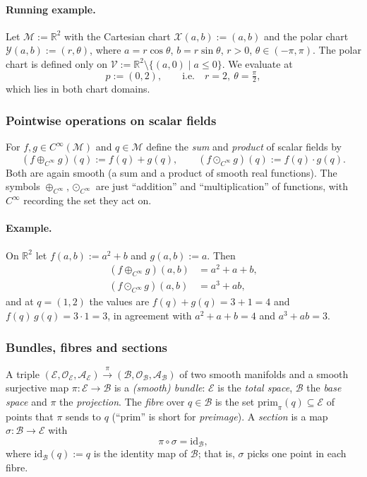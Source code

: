 \documentclass[11pt]{article}
\newcommand{\Cinf}{C^\infty(\mathcal M)}
\begin{document}
\paragraph{Running example.} Let $\mathcal M:=\mathbb R^2$ with the Cartesian chart $\mathcal X(a,b):=(a,b)$ and the polar chart $\mathcal Y(a,b):=(r,\theta)$, where $a=r\cos\theta$, $b=r\sin\theta$, $r>0$, $\theta\in(-\pi,\pi)$. The polar chart is defined only on $\mathcal V:=\mathbb R^2\setminus\{(a,0)\mid a\le0\}$. We evaluate at
\[
p:=(0,2),\qquad\text{i.e.}\quad r=2,\ \theta=\tfrac\pi2,
\]
which lies in both chart domains.

\subsubsection*{Pointwise operations on scalar fields}
For $f,g\in\Cinf$ and $q\in\mathcal M$ define the \emph{sum} and \emph{product} of scalar fields by
\[
(f\oplus_{C^\infty}g)(q):=f(q)+g(q),\qquad (f\odot_{C^\infty}g)(q):=f(q)\cdot g(q).
\]
Both are again smooth (a sum and a product of smooth real functions). The symbols $\oplus_{C^\infty},\odot_{C^\infty}$ are just ``addition'' and ``multiplication'' of functions, with $C^\infty$ recording the set they act on.

\paragraph{Example.} On $\mathbb R^2$ let $f(a,b):=a^2+b$ and $g(a,b):=a$. Then
\begin{align*}
(f\oplus_{C^\infty}g)(a,b)&=a^2+a+b,\\
(f\odot_{C^\infty}g)(a,b)&=a^3+ab,
\end{align*}
and at $q=(1,2)$ the values are $f(q)+g(q)=3+1=4$ and $f(q)\,g(q)=3\cdot1=3$, in agreement with $a^2+a+b=4$ and $a^3+ab=3$.

\subsubsection*{Bundles, fibres and sections}
A triple $(\mathcal E,\mathcal O_{\mathcal E},\mathcal A_{\mathcal E})\xrightarrow{\ \pi\ }(\mathcal B,\mathcal O_{\mathcal B},\mathcal A_{\mathcal B})$ of two smooth manifolds and a smooth surjective map $\pi:\mathcal E\to\mathcal B$ is a \emph{(smooth) bundle}: $\mathcal E$ is the \emph{total space}, $\mathcal B$ the \emph{base space} and $\pi$ the \emph{projection}. The \emph{fibre} over $q\in\mathcal B$ is the set $\mathrm{prim}_\pi(q)\subseteq\mathcal E$ of points that $\pi$ sends to $q$ (``prim'' is short for \emph{preimage}). A \emph{section} is a map $\sigma:\mathcal B\to\mathcal E$ with
\[
\pi\circ\sigma=\mathrm{id}_{\mathcal B},
\]
where $\mathrm{id}_{\mathcal B}(q):=q$ is the identity map of $\mathcal B$; that is, $\sigma$ picks one point in each fibre.
\end{document}
